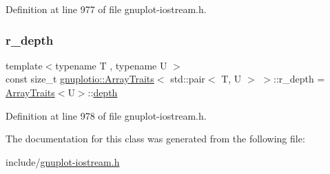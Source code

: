 Definition at line 977 of file gnuplot-\/iostream.\+h.

\mbox{\label{classgnuplotio_1_1_array_traits_3_01std_1_1pair_3_01_t_00_01_u_01_4_01_4_a1b7e7f8976a5d0ed20b93ede3e25a546}} 
\subsubsection{\texorpdfstring{r\+\_\+depth}{r\_depth}}
{\footnotesize\ttfamily template$<$typename T , typename U $>$ \\
const size\+\_\+t \hyperlink{classgnuplotio_1_1_array_traits}{gnuplotio\+::\+Array\+Traits}$<$ std\+::pair$<$ T, U $>$ $>$\+::r\+\_\+depth = \hyperlink{classgnuplotio_1_1_array_traits}{Array\+Traits}$<$U$>$\+::\hyperlink{classgnuplotio_1_1_array_traits_3_01std_1_1pair_3_01_t_00_01_u_01_4_01_4_a11b3be89ac9506fcfcceb318acc7e2bf}{depth}\hspace{0.3cm}{\ttfamily [static]}}



Definition at line 978 of file gnuplot-\/iostream.\+h.



The documentation for this class was generated from the following file\+:\begin{DoxyCompactItemize}
\item 
include/\hyperlink{gnuplot-iostream_8h}{gnuplot-\/iostream.\+h}\end{DoxyCompactItemize}
